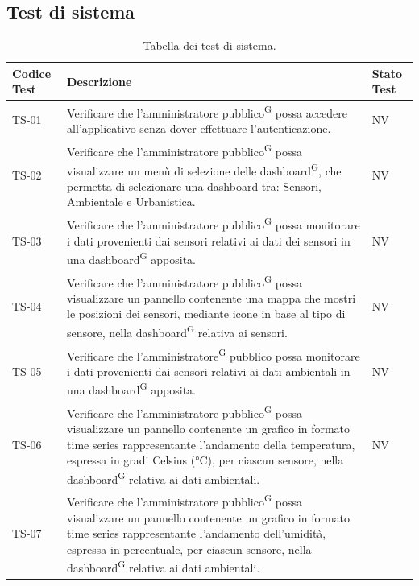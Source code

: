 \documentclass[8pt]{article}
\newcommand{\glossterm}[1]{#1\textsuperscript{G}} %
\begin{document}
\subsection{Test di sistema}
\renewcommand{\arraystretch}{2.5}
\begin{longtable}{|>{\centering}p{2cm}|>{\RaggedRight}m{12cm}|>{\centering\arraybackslash}p{2cm}|}
    \hline
    \rowcolor{white}
    \textbf{Codice Test} & \textbf{Descrizione} & \textbf{Stato Test} \\
    \hline
    \endfirsthead 
    \rowcolor{white}
    \caption{Tabella dei test di sistema.} 
    \label{table:Tabella dei test di sistema}
    \endlastfoot 
    TS-01 & Verificare che l’\glossterm{amministratore pubblico} possa accedere all’applicativo
    senza dover effettuare l’autenticazione. & NV\\
    \hline
    TS-02 & Verificare che l’\glossterm{amministratore pubblico} possa visualizzare un menù di selezione delle
    \glossterm{dashboard}, che permetta di selezionare una dashboard tra: Sensori, Ambientale e Urbanistica. & NV\\
    \hline
    TS-03 & Verificare che l’\glossterm{amministratore pubblico} possa  monitorare i dati
    provenienti dai sensori relativi ai dati dei sensori in una \glossterm{dashboard} apposita.
    & NV \\
    \hline
    TS-04 & Verificare che l’\glossterm{amministratore pubblico} possa visualizzare un pannello
    contenente una mappa che mostri le posizioni dei sensori, mediante icone in base al tipo di sensore, nella \glossterm{dashboard} relativa ai sensori.
    & NV \\
    \hline
    TS-05 & Verificare che l’\glossterm{amministratore} pubblico possa monitorare i dati provenienti
    dai sensori relativi ai dati ambientali in una \glossterm{dashboard} apposita.
    & NV \\
    \hline
    TS-06 & Verificare che l’\glossterm{amministratore pubblico} possa visualizzare un pannello
    contenente un grafico in formato time series rappresentante l'andamento della temperatura,
    espressa in gradi Celsius (°C), per ciascun sensore, nella \glossterm{dashboard} relativa ai dati ambientali.
    & NV \\
    \hline
    TS-07 & Verificare che l’\glossterm{amministratore pubblico} possa visualizzare un pannello
    contenente un grafico in formato time series rappresentante l'andamento dell'umidità, espressa
    in percentuale, per ciascun sensore, nella \glossterm{dashboard} relativa ai dati ambientali.

\end{longtable}
\end{document}
